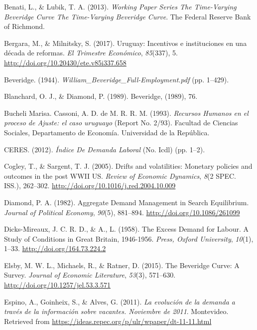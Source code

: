 \documentclass[12pt,twoside]{reedthesis}
\begin{document}
\leavevmode\hypertarget{ref-Benati2013}{}%
Benati, L., \& Lubik, T. A. (2013). \emph{Working Paper Series The Time-Varying Beveridge Curve The Time-Varying Beveridge Curve}. The Federal Reserve Bank of Richmond.

\leavevmode\hypertarget{ref-Bergara2017}{}%
Bergara, M., \& Milnitsky, S. (2017). Uruguay: Incentivos e instituciones en una década de reformas. \emph{El Trimestre Económico}, \emph{85}(337), 5. \url{http://doi.org/10.20430/ete.v85i337.658}

\leavevmode\hypertarget{ref-Beveridge}{}%
Beveridge. (1944). \emph{William\_Beveridge\_Full-Employment.pdf} (pp. 1--429).

\leavevmode\hypertarget{ref-Blanchard1989}{}%
Blanchard, O. J., \& Diamond, P. (1989). Beveridge, (1989), 76.

\leavevmode\hypertarget{ref-DECON1993}{}%
Bucheli Marisa. Cassoni, A. D. de M. R. R. M. (1993). \emph{Recursos Humanos en el proceso de Ajuste: el caso uruguayo} (Report No. 2/93). Facultad de Ciencias Sociales, Departamento de Economía. Universidad de la República.

\leavevmode\hypertarget{ref-Ceres2012}{}%
CERES. (2012). \emph{Índice De Demanda Laboral} (No. Icdl) (pp. 1--2).

\leavevmode\hypertarget{ref-Cogley2005}{}%
Cogley, T., \& Sargent, T. J. (2005). Drifts and volatilities: Monetary policies and outcomes in the post WWII US. \emph{Review of Economic Dynamics}, \emph{8}(2 SPEC. ISS.), 262--302. \url{http://doi.org/10.1016/j.red.2004.10.009}

\leavevmode\hypertarget{ref-Diamond1982}{}%
Diamond, P. A. (1982). Aggregate Demand Management in Search Equilibrium. \emph{Journal of Political Economy}, \emph{90}(5), 881--894. \url{http://doi.org/10.1086/261099}

\leavevmode\hypertarget{ref-Dicks-Mireaux1958}{}%
Dicks-Mireaux, J. C. R. D., \& A., L. (1958). The Excess Demand for Labour. A Study of Conditions in Great Britain, 1946-1956. \emph{Press, Oxford University}, \emph{10}(1), 1--33. \url{http://doi.org/164.73.224.2}

\leavevmode\hypertarget{ref-Elsby2015}{}%
Elsby, M. W. L., Michaels, R., \& Ratner, D. (2015). The Beveridge Curve: A Survey. \emph{Journal of Economic Literature}, \emph{53}(3), 571--630. \url{http://doi.org/10.1257/jel.53.3.571}

\leavevmode\hypertarget{ref-Alma2011}{}%
Espino, A., Goinheix, S., \& Alves, G. (2011). \emph{La evolución de la demanda a través de la información sobre vacantes. Noviembre de 2011}. Montevideo. Retrieved from \url{https://ideas.repec.org/p/ulr/wpaper/dt-11-11.html}
\end{document}
